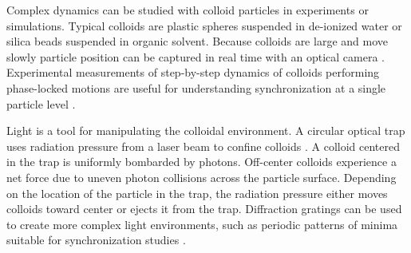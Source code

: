 \documentclass[twocolumn,preprintnumbers,amsmath,amssymb,aps,prx]{revtex4}
\begin{document}

Complex dynamics can be studied with
colloid particles in experiments or simulations.
Typical colloids are   
plastic spheres suspended in
de-ionized water or silica beads suspended in organic solvent.
Because 
colloids are large %
and move slowly %
particle position 
can be captured in real time 
with an optical camera \cite{Pertsinidis2001}. %
Experimental measurements of 
step-by-step dynamics of 
colloids performing phase-locked motions
are useful for
understanding synchronization at a single particle level \cite{Juniper2015}.
 

Light is a
tool for manipulating the colloidal environment.
A circular optical trap uses 
radiation pressure from 
a laser beam to confine colloids \cite{Ashkin1997}.
A colloid centered in the trap is %
uniformly bombarded by photons. %
Off-center colloids %
experience a net force
due to uneven photon collisions across
the particle surface.
Depending on the %
location of the particle in the trap,
the radiation pressure either moves colloids toward center 
or ejects it from the trap.
Diffraction gratings can be used to create
more complex light environments, 
such as periodic patterns of minima
suitable for synchronization studies \cite{Grier2003}.
\end{document}
